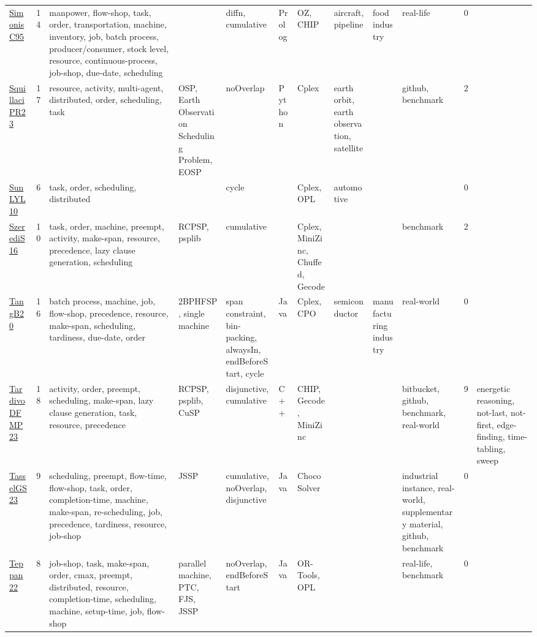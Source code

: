 {\begin{longtable}{p{3cm}rp{4cm}p{1.5cm}p{2cm}p{1.5cm}p{1.5cm}p{1.5cm}p{1.5cm}p{2cm}rp{1.5cm}}
\href{papers/SimonisC95.pdf}{SimonisC95}~\cite{SimonisC95} & 14 & manpower, flow-shop, task, order, transportation, machine, inventory, job, batch process, producer/consumer, stock level, resource, continuous-process, job-shop, due-date, scheduling &  & diffn, cumulative & Prolog & OZ, CHIP & aircraft, pipeline & food industry & real-life & 0 & \\
\href{papers/SquillaciPR23.pdf}{SquillaciPR23}~\cite{SquillaciPR23} & 17 & resource, activity, multi-agent, distributed, order, scheduling, task & OSP, Earth Observation Scheduling Problem, EOSP & noOverlap & Python & Cplex & earth orbit, earth observation, satellite &  & github, benchmark & 2 & \\
\href{papers/SunLYL10.pdf}{SunLYL10}~\cite{SunLYL10} & 6 & task, order, scheduling, distributed &  & cycle &  & Cplex, OPL & automotive &  &  & 0 & \\
\href{papers/SzerediS16.pdf}{SzerediS16}~\cite{SzerediS16} & 10 & task, order, machine, preempt, activity, make-span, resource, precedence, lazy clause generation, scheduling & RCPSP, psplib & cumulative &  & Cplex, MiniZinc, Chuffed, Gecode &  &  & benchmark & 2 & \\
\href{papers/TangB20.pdf}{TangB20}~\cite{TangB20} & 16 & batch process, machine, job, flow-shop, precedence, resource, make-span, scheduling, tardiness, due-date, order & 2BPHFSP, single machine & span constraint, bin-packing, alwaysIn, endBeforeStart, cycle & Java & Cplex, CPO & semiconductor & manufacturing industry & real-world & 0 & \\
\href{papers/TardivoDFMP23.pdf}{TardivoDFMP23}~\cite{TardivoDFMP23} & 18 & activity, order, preempt, scheduling, make-span, lazy clause generation, task, resource, precedence & RCPSP, psplib, CuSP & disjunctive, cumulative & C++ & CHIP, Gecode, MiniZinc &  &  & bitbucket, github, benchmark, real-world & 9 & energetic reasoning, not-last, not-first, edge-finding, time-tabling, sweep\\
\href{papers/TasselGS23.pdf}{TasselGS23}~\cite{TasselGS23} & 9 & scheduling, preempt, flow-time, flow-shop, task, order, completion-time, machine, make-span, re-scheduling, job, precedence, tardiness, resource, job-shop & JSSP & cumulative, noOverlap, disjunctive & Java & Choco Solver &  &  & industrial instance, real-world, supplementary material, github, benchmark & 0 & \\
\href{papers/Teppan22.pdf}{Teppan22}~\cite{Teppan22} & 8 & job-shop, task, make-span, order, cmax, preempt, distributed, resource, completion-time, scheduling, machine, setup-time, job, flow-shop & parallel machine, PTC, FJS, JSSP & noOverlap, endBeforeStart & Java & OR-Tools, OPL &  &  & real-life, benchmark & 0 & \\

\end{longtable}}
